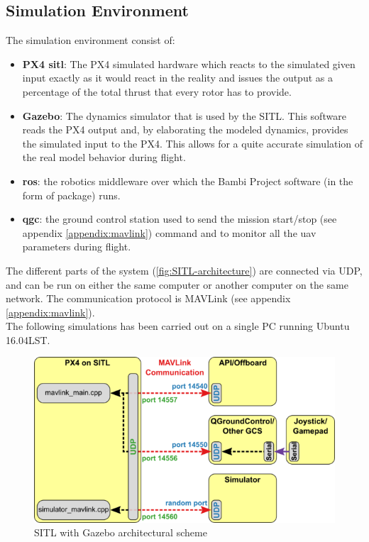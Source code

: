 \subsection{Simulation Environment} %
\label{ssec:simulation_environment}
The simulation environment consist of:
\begin{itemize}
 	\item \textbf{PX4 \acrshort{sitl}}: The PX4 simulated hardware which reacts to the simulated given input exactly as it would react in the reality and issues the output as a percentage of the total thrust that every rotor has to provide.
 	\item \textbf{Gazebo}: The dynamics simulator that is used by the SITL. This software reads the PX4 output and, by elaborating the modeled dynamics, provides the simulated input to the PX4. This allows for a quite accurate simulation of the real model behavior during flight.
 	\item \textbf{\acrshort{ros}}: the robotics middleware over which the Bambi Project software (in the form of package) runs.
 	\item \textbf{\acrshort{qgc}}: the ground control station used to send the mission start/stop (see appendix \ref{appendix:mavlink}) command and to monitor all the \acrshort{uav} parameters during flight.
 \end{itemize}
 The different parts of the system (\autoref{fig:SITL-architecture}) are connected via UDP, and can be run on either the same computer or another computer on the same network. The communication protocol is MAVLink (see appendix \ref{appendix:mavlink}). \\
 The following simulations has been carried out on a single PC running Ubuntu 16.04LST.
 \begin{figure}[ht]
    \centering
    \includegraphics[width=.7\textwidth]{figures/C4/Px4_sitl_overview}
    \caption{SITL with Gazebo architectural scheme}
    \label{fig:SITL-architecture}
\end{figure}

